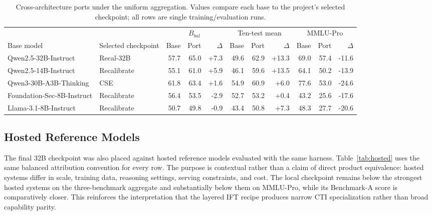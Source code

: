 \documentclass[conference]{IEEEtran}
\begin{document}
\begin{table}[t]
\caption{Cross-architecture ports under the uniform aggregation. Values compare each base to the project's selected checkpoint; all rows are single training/evaluation runs.}
\label{tab:ports}
\centering
\scriptsize
\setlength{\tabcolsep}{3.3pt}
\begin{tabular}{@{}llrrrrrrrrr@{}}
\toprule
& & \multicolumn{3}{c}{$B_{bal}$} & \multicolumn{3}{c}{Ten-test mean} & \multicolumn{3}{c}{MMLU-Pro} \\
Base model & Selected checkpoint & Base & Port & $\Delta$ & Base & Port & $\Delta$ & Base & Port & $\Delta$ \\
\midrule
Qwen2.5-32B-Instruct & Recal-32B & 57.7 & 65.0 & +7.3 & 49.6 & 62.9 & +13.3 & 69.0 & 57.4 & -11.6 \\
Qwen2.5-14B-Instruct & Recalibrate & 55.1 & 61.0 & +5.9 & 46.1 & 59.6 & +13.5 & 64.1 & 50.2 & -13.9 \\
Qwen3-30B-A3B-Thinking & CSE & 61.8 & 63.4 & +1.6 & 54.9 & 60.9 & +6.0 & 77.6 & 53.0 & -24.6 \\
Foundation-Sec-8B-Instruct & Recalibrate & 56.4 & 53.5 & -2.9 & 52.7 & 53.2 & +0.4 & 43.2 & 25.6 & -17.6 \\
Llama-3.1-8B-Instruct & Recalibrate & 50.7 & 49.8 & -0.9 & 43.4 & 50.8 & +7.3 & 48.3 & 27.7 & -20.6 \\
\bottomrule
\end{tabular}
\end{table}

\subsection{Hosted Reference Models}
The final 32B checkpoint was also placed against hosted reference models evaluated with the same harness. Table~\ref{tab:hosted} uses the same balanced attribution convention for every row. The purpose is contextual rather than a claim of direct product equivalence: hosted systems differ in scale, training data, reasoning settings, serving constraints, and cost. The local checkpoint remains below the strongest hosted systems on the three-benchmark aggregate and substantially below them on MMLU-Pro, while its Benchmark-A score is comparatively closer. This reinforces the interpretation that the layered IFT recipe produces narrow CTI specialization rather than broad capability parity.
\end{document}
